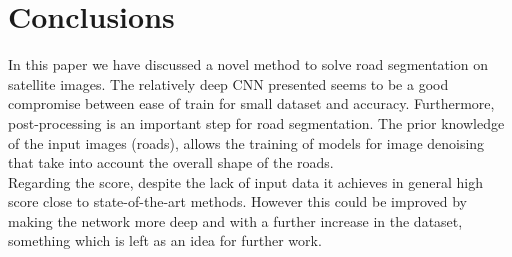 \documentclass[10pt,conference,compsocconf]{IEEEtran}
\begin{document}
\section{Conclusions}
\label{sec:conclusions}
In this paper we have discussed a novel method to solve road segmentation on satellite images. The relatively deep CNN presented seems to be a good compromise between ease of train for small dataset and accuracy. Furthermore, post-processing is an important step for road segmentation. The prior knowledge of the input images (roads), allows the training of models for image denoising that take into account the overall shape of the roads.\\
Regarding the score, despite the lack of input data it achieves in general high score close to state-of-the-art methods. However this could be improved by making the network more deep and with a further increase in the dataset, something which is left as an idea for further work.






\end{document}
